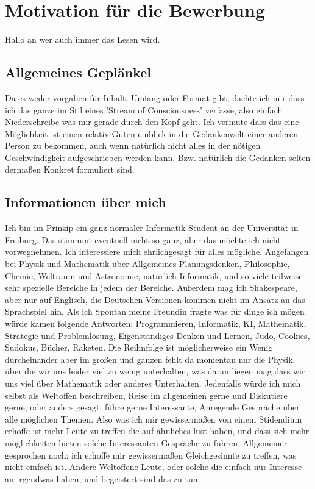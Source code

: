 \documentclass{scrartcl}
\begin{document}
\section*{Motivation für die Bewerbung}

Hallo an wer auch immer das Lesen wird. \\


\subsection*{Allgemeines Geplänkel}

Da es weder vorgaben für Inhalt, Umfang oder Format gibt, dachte ich mir dass ich das ganze
im Stil eines 'Stream of Consciousness' verfasse, also einfach Niederschreibe was mir gerade
durch den Kopf geht. Ich vermute dass das eine Möglichkeit ist einen relativ Guten einblick
in die Gedankenwelt einer anderen Person zu bekommen, auch wenn natürlich nicht alles in der
nötigen Geschwindigkeit aufgeschrieben werden kann, Bzw. natürlich die Gedanken selten dermaßen
Konkret formuliert sind.  \\


\subsection*{Informationen über mich}

Ich bin im Prinzip ein ganz normaler Informatik-Student an der Universität in Freiburg. Das
stimmmt eventuell nicht so ganz, aber das möchte ich nicht vorwegnehmen. Ich interessiere mich
ehrlichgesagt für alles mögliche. Angefangen bei Physik und Mathematik über Allgemeines
Planungsdenken, Philosophie, Chemie, Weltraum und Astronomie, natürlich Informatik, und
so viele teilweise sehr spezielle Bereiche in jedem der Bereiche. Außerdem mag ich Shakespeare,
aber nur auf Englisch, die Deutschen Versionen kommen nicht im Ansatz an das Sprachspiel hin.
Als ich Spontan meine Freundin fragte was für dinge ich mögen würde kamen folgende Antworten:
Programmieren, Informatik, KI, Mathematik, Strategie und Problemlösung, Eigenständiges Denken und Lernen,
Judo, Cookies, Sudokus, Bücher, Raketen. Die Reihnfolge ist möglicherweise ein Wenig durcheinander
aber im großen und ganzen fehlt da momentan nur die Physik, über die wir uns leider viel zu wenig
unterhalten, was daran liegen mag dass wir uns viel über Mathematik oder anderes Unterhalten.
Jedenfalls würde ich mich selbst als Weltoffen beschreiben, Reise im allgemeinen gerne
und Diskutiere gerne, oder anders gesagt: führe gerne Interessante, Anregende Gespräche über
alle möglichen Themen. Also was ich mir gewissermaßen von einem Stidendium erhoffe ist
mehr Leute zu treffen die auf ähnliches lust haben, und dass sich mehr möglichkeiten bieten
solche Interessanten Gespräche zu führen. Allgemeiner gesprochen noch: ich erhoffe mir
gewissermaßen Gleichgesinnte zu treffen, was nicht einfach ist. Andere Weltoffene Leute,
oder solche die einfach nur Interesse an irgendwas haben, und begeistert sind das zu tun. \\
\end{document}
